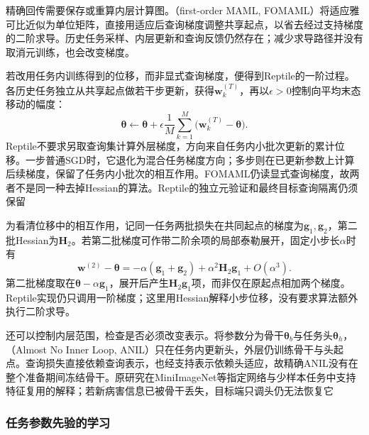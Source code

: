 精确回传需要保存或重算内层计算图。（first-order MAML, FOMAML）将适应雅可比近似为单位矩阵，直接用适应后查询梯度调整共享起点，以省去经过支持梯度的二阶求导。历史任务采样、内层更新和查询反馈仍然存在；减少求导路径并没有取消元训练，也会改变梯度。

若改用任务内训练得到的位移，而非显式查询梯度，便得到Reptile的一阶过程。各历史任务独立从共享起点做若干步更新，获得$\bm w_k^{(T)}$，再以$\epsilon>0$控制向平均末态移动的幅度：
\begin{equation}
  \bm{\theta}\leftarrow\bm{\theta}
   +\epsilon\frac1M\sum_{k=1}^{M}
        \bigl(\bm w_k^{(T)}-\bm{\theta}\bigr).
  \label{eq:ket-transfer-reptile}
\end{equation}
Reptile不要求另取查询集计算外层梯度，方向来自任务内小批次更新的累计位移。一步普通SGD时，它退化为混合任务梯度方向；多步则在已更新参数上计算后续梯度，保留了任务内小批次的相互作用。FOMAML仍读显式查询梯度，故两者不是同一种去掉Hessian的算法。Reptile的独立元验证和最终目标查询隔离仍须保留

为看清位移中的相互作用，记同一任务两批损失在共同起点的梯度为$\bm g_1,\bm g_2$，第二批Hessian为$\bm H_2$。若第二批梯度可作带二阶余项的局部泰勒展开，固定小步长$\alpha$时有
\[
  \bm w^{(2)}-\bm{\theta}
    =-\alpha(\bm g_1+\bm g_2)
      +\alpha^2\bm H_2\bm g_1+O(\alpha^3).
\]
第二批梯度取在$\bm\theta-\alpha\bm g_1$，展开后产生$\bm H_2\bm g_1$项，而非仅在原起点相加两个梯度。Reptile实现仍只调用一阶梯度；这里用Hessian解释小步位移，没有要求算法额外执行二阶求导。

还可以控制内层范围，检查是否必须改变表示。将参数分为骨干$\bm\theta_b$与任务头$\bm\theta_h$，（Almost No Inner Loop, ANIL）只在任务内更新头，外层仍训练骨干与头起点。查询损失直接依赖查询表示，也经支持表示依赖头适应，故精确ANIL没有在整个准备期间冻结骨干。原研究在MiniImageNet等指定网络与少样本任务中支持特征复用的解释；若新病害信息已被骨干丢失，目标端只调头仍无法恢复它

\subsubsection{任务参数先验的学习}
\label{sec:ket-transfer-prior}

